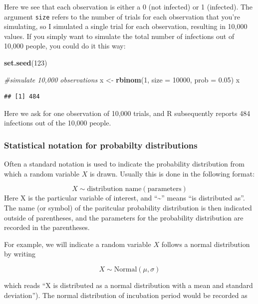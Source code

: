 \documentclass[
]{book}
\newenvironment{Shaded}{\begin{snugshade}}{\end{snugshade}}
\newcommand{\AttributeTok}[1]{\textcolor[rgb]{0.13,0.29,0.53}{#1}}
\newcommand{\CommentTok}[1]{\textcolor[rgb]{0.56,0.35,0.01}{\textit{#1}}}
\newcommand{\DecValTok}[1]{\textcolor[rgb]{0.00,0.00,0.81}{#1}}
\newcommand{\FloatTok}[1]{\textcolor[rgb]{0.00,0.00,0.81}{#1}}
\newcommand{\FunctionTok}[1]{\textcolor[rgb]{0.13,0.29,0.53}{\textbf{#1}}}
\newcommand{\NormalTok}[1]{#1}
\newcommand{\OtherTok}[1]{\textcolor[rgb]{0.56,0.35,0.01}{#1}}
\begin{document}
Here we see that each observation is either a 0 (not infected) or 1 (infected). The argument \texttt{size} refers to the number of trials for each observation that you're simulating, so I simulated a single trial for each observation, resulting in 10,000 values. If you simply want to simulate the total number of infections out of 10,000 people, you could do it this way:

\begin{Shaded}
\begin{Highlighting}[]
\FunctionTok{set.seed}\NormalTok{(}\DecValTok{123}\NormalTok{)}

\CommentTok{\#simulate 10,000 observations}
\NormalTok{x }\OtherTok{\textless{}{-}} \FunctionTok{rbinom}\NormalTok{(}\DecValTok{1}\NormalTok{, }\AttributeTok{size =} \DecValTok{10000}\NormalTok{, }\AttributeTok{prob =} \FloatTok{0.05}\NormalTok{)}
\NormalTok{x}
\end{Highlighting}
\end{Shaded}

\begin{verbatim}
## [1] 484
\end{verbatim}

Here we ask for one observation of 10,000 trials, and R subsequently reports 484 infections out of the 10,000 people.

\subsubsection{Statistical notation for probabilty distributions}\label{statistical-notation-for-probabilty-distributions}

Often a standard notation is used to indicate the probability distribution from which a random variable \(X\) is drawn. Usually this is done in the following format:

\[
X\sim \text{distribution name}(\text{parameters})
\]
Here X is the particular variable of interest, and ``\textasciitilde{}'' means ``is distributed as''. The name (or symbol) of the paritcular probability distribution is then indicated outside of parentheses, and the parameters for the probability distribution are recorded in the parentheses.

For example, we will indicate a random variable \(X\) follows a normal distribution by writing

\[
X\sim \text{Normal}(\mu, \sigma)
\]

which reads ``X is distributed as a normal distribution with a mean and standard deviation''). The normal distribution of incubation period would be recorded as
\end{document}

